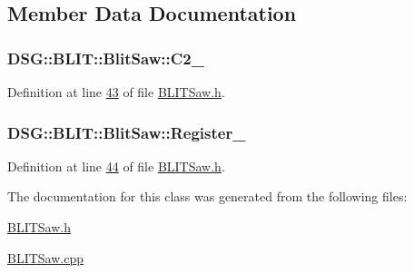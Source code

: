 \subsection{Member Data Documentation}
\hypertarget{class_d_s_g_1_1_b_l_i_t_1_1_blit_saw_a39ff301ab1f690c070b2045d4a2c40bf}{
\subsubsection[{C2\+\_\+}]{ D\+S\+G\+::\+B\+L\+I\+T\+::\+Blit\+Saw\+::\+C2\+\_\+\hspace{0.3cm}{\ttfamily [protected]}}}\label{class_d_s_g_1_1_b_l_i_t_1_1_blit_saw_a39ff301ab1f690c070b2045d4a2c40bf}


Definition at line \hyperlink{_b_l_i_t_saw_8h_source_l00043}{43} of file \hyperlink{_b_l_i_t_saw_8h_source}{B\+L\+I\+T\+Saw.\+h}.

\hypertarget{class_d_s_g_1_1_b_l_i_t_1_1_blit_saw_a15da9acffc369dd3c5233c05d37ee488}{
\subsubsection[{Register\+\_\+}]{ D\+S\+G\+::\+B\+L\+I\+T\+::\+Blit\+Saw\+::\+Register\+\_\+\hspace{0.3cm}{\ttfamily [protected]}}}\label{class_d_s_g_1_1_b_l_i_t_1_1_blit_saw_a15da9acffc369dd3c5233c05d37ee488}


Definition at line \hyperlink{_b_l_i_t_saw_8h_source_l00044}{44} of file \hyperlink{_b_l_i_t_saw_8h_source}{B\+L\+I\+T\+Saw.\+h}.



The documentation for this class was generated from the following files\+:\begin{DoxyCompactItemize}
\item 
\hyperlink{_b_l_i_t_saw_8h}{B\+L\+I\+T\+Saw.\+h}\item 
\hyperlink{_b_l_i_t_saw_8cpp}{B\+L\+I\+T\+Saw.\+cpp}\end{DoxyCompactItemize}
